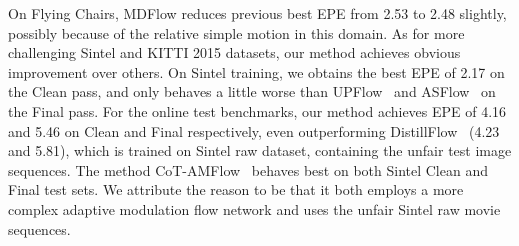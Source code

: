 \documentclass[lettersize,journal]{IEEEtran}
\begin{document}
On Flying Chairs, MDFlow reduces previous best EPE from 2.53 to 2.48 slightly, possibly because of the relative simple motion in this domain. As for more challenging Sintel and KITTI 2015 datasets, our method achieves obvious improvement over others. On Sintel training, we obtains the best EPE of 2.17 on the Clean pass, and only behaves a little worse than UPFlow~\cite{Luo_2021_CVPR} and ASFlow~\cite{9625946} on the Final pass. For the online test benchmarks, our method achieves EPE of 4.16 and 5.46 on Clean and Final respectively, even outperforming DistillFlow~\cite{9444870} (4.23 and 5.81), which is trained on Sintel raw dataset, containing the unfair test image sequences. The method CoT-AMFlow~\cite{Wang_CoRL_2020} behaves best on both Sintel Clean and Final test sets. We attribute the reason to be that it both employs a more complex adaptive modulation flow network and uses the unfair Sintel raw movie sequences.
\end{document}
